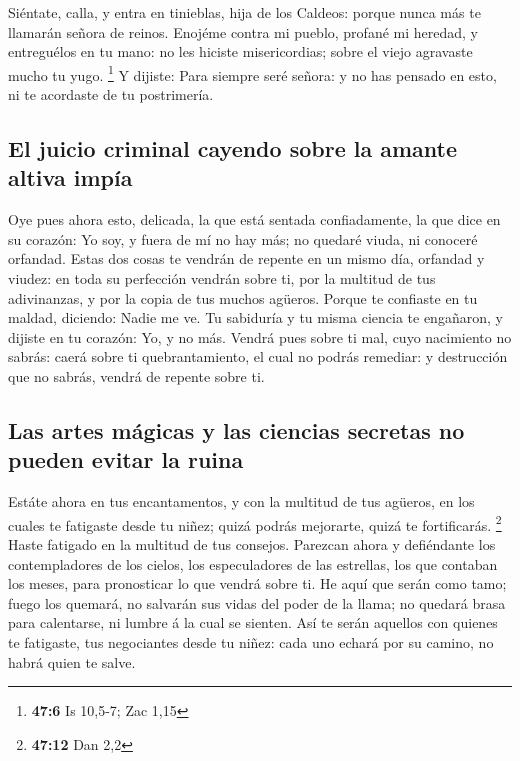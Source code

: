  Siéntate, calla, y entra en tinieblas, hija de los Caldeos:
porque nunca más te llamarán señora de reinos.  Enojéme
contra mi pueblo, profané mi heredad, y entreguélos en tu mano: no les
hiciste misericordias; sobre el viejo agravaste mucho tu yugo.
\footnote{\textbf{47:6} Is 10,5-7; Zac 1,15}  Y dijiste:
Para siempre seré señora: y no has pensado en esto, ni te acordaste de
tu postrimería.

\hypertarget{el-juicio-criminal-cayendo-sobre-la-amante-altiva-impuxeda}{%
\subsection{El juicio criminal cayendo sobre la amante altiva
impía}\label{el-juicio-criminal-cayendo-sobre-la-amante-altiva-impuxeda}}

 Oye pues ahora esto, delicada, la que está sentada
confiadamente, la que dice en su corazón: Yo soy, y fuera de mí no hay
más; no quedaré viuda, ni conoceré orfandad.  Estas dos
cosas te vendrán de repente en un mismo día, orfandad y viudez: en toda
su perfección vendrán sobre ti, por la multitud de tus adivinanzas, y
por la copia de tus muchos agüeros.  Porque te confiaste en
tu maldad, diciendo: Nadie me ve. Tu sabiduría y tu misma ciencia te
engañaron, y dijiste en tu corazón: Yo, y no más.  Vendrá
pues sobre ti mal, cuyo nacimiento no sabrás: caerá sobre ti
quebrantamiento, el cual no podrás remediar: y destrucción que no
sabrás, vendrá de repente sobre ti.

\hypertarget{las-artes-muxe1gicas-y-las-ciencias-secretas-no-pueden-evitar-la-ruina}{%
\subsection{Las artes mágicas y las ciencias secretas no pueden evitar
la
ruina}\label{las-artes-muxe1gicas-y-las-ciencias-secretas-no-pueden-evitar-la-ruina}}

 Estáte ahora en tus encantamentos, y con la multitud de
tus agüeros, en los cuales te fatigaste desde tu niñez; quizá podrás
mejorarte, quizá te fortificarás. \footnote{\textbf{47:12} Dan 2,2}
 Haste fatigado en la multitud de tus consejos. Parezcan
ahora y defiéndante los contempladores de los cielos, los especuladores
de las estrellas, los que contaban los meses, para pronosticar lo que
vendrá sobre ti.  He aquí que serán como tamo; fuego los
quemará, no salvarán sus vidas del poder de la llama; no quedará brasa
para calentarse, ni lumbre á la cual se sienten.  Así te
serán aquellos con quienes te fatigaste, tus negociantes desde tu niñez:
cada uno echará por su camino, no habrá quien te salve.


